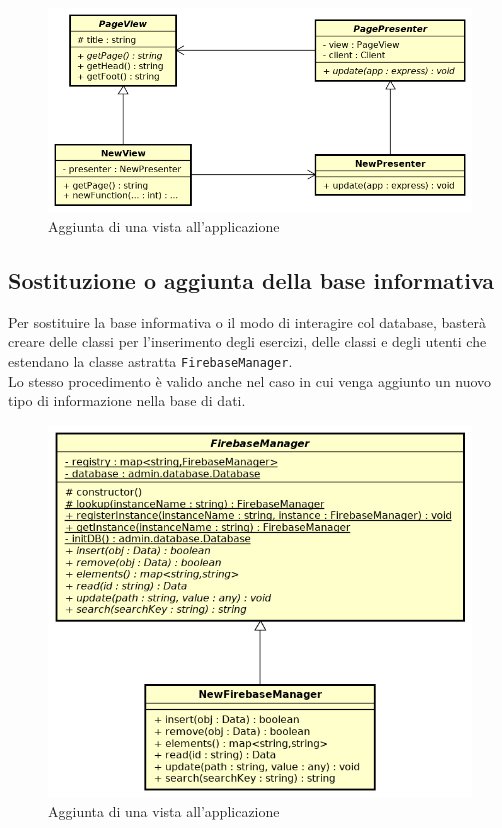 \begin{figure}[ht]
	\includegraphics[scale=0.75]{images/newview.png}
	\caption{Aggiunta di una vista all'applicazione}
\end{figure}
\newpage

\subsection{Sostituzione o aggiunta della base informativa}
Per sostituire la base informativa o il modo di interagire col database, basterà creare delle classi per l'inserimento degli esercizi, delle classi e degli utenti che estendano la classe astratta \texttt{FirebaseManager}.\\
Lo stesso procedimento è valido anche nel caso in cui venga aggiunto un nuovo tipo di informazione nella base di dati.\\
\vspace*{3em}

\begin{figure}[ht]
	\centering
	\includegraphics[scale=0.75]{images/newfirebasemanager.png}
	\caption{Aggiunta di una vista all'applicazione}
\end{figure}